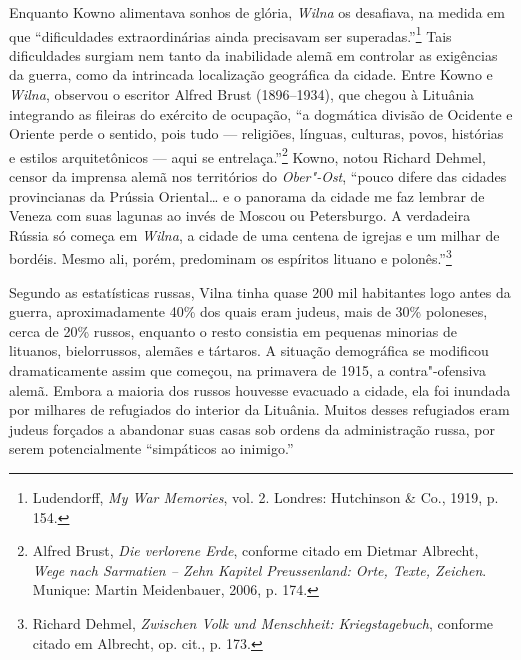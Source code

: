 Enquanto Kowno alimentava sonhos de glória, \textit{Wilna} os desafiava, na
medida em que ``dificuldades extraordinárias ainda precisavam ser
superadas.''\footnote{Ludendorff, \textit{My War Memories}, vol. 2. Londres: Hutchinson \& Co., 1919, p. 154.} Tais dificuldades surgiam nem tanto da inabilidade alemã em controlar as exigências da guerra,
como da intrincada localização geográfica da cidade. Entre Kowno e
\textit{Wilna}, observou o escritor Alfred Brust (1896--1934), que chegou à
Lituânia integrando as fileiras do exército de ocupação, ``a dogmática
divisão de Ocidente e Oriente perde o sentido, pois tudo --- religiões,
línguas, culturas, povos, histórias e estilos arquitetônicos --- aqui se
entrelaça.''\footnote{Alfred Brust, \textit{Die verlorene Erde}, conforme citado em Dietmar Albrecht, \textit{Wege nach Sarmatien -- Zehn Kapitel Preussenland: Orte, Texte, Zeichen}. Munique: Martin Meidenbauer, 2006, p. 174.} Kowno, notou Richard Dehmel, censor da imprensa alemã nos territórios do \textit{Ober"-Ost}, ``pouco difere das cidades
provincianas da Prússia Oriental\ldots{} e o panorama da cidade me faz
lembrar de Veneza com suas lagunas ao invés de Moscou ou Petersburgo. A
verdadeira Rússia só começa em \textit{Wilna}, a cidade de uma centena de igrejas
e um milhar de bordéis. Mesmo ali, porém, predominam os espíritos
lituano e polonês.''\footnote{Richard Dehmel, \textit{Zwischen Volk und Menschheit: Kriegstagebuch}, conforme citado em Albrecht, op. cit., p. 173.}

Segundo as estatísticas russas, Vilna tinha quase 200 mil habitantes
logo antes da guerra, aproximadamente 40\% dos quais eram judeus, mais
de 30\% poloneses, cerca de 20\% russos, enquanto o resto consistia em
pequenas minorias de lituanos, bielorrussos, alemães e tártaros. A
situação demográfica se modificou dramaticamente assim que começou, na
primavera de 1915, a contra"-ofensiva alemã. Embora a maioria dos russos
houvesse evacuado a cidade, ela foi inundada por milhares de refugiados
do interior da Lituânia. Muitos desses refugiados eram judeus forçados a
abandonar suas casas sob ordens da administração russa, por serem
potencialmente ``simpáticos ao inimigo.''

